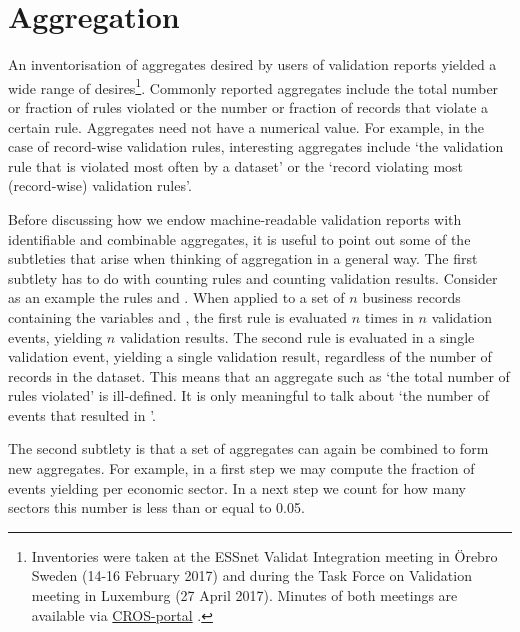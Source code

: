 \section{Aggregation}
\label{sect:aggregation}
An inventorisation of aggregates desired by users of validation reports
yielded a wide range of desires\footnote{Inventories were taken at 
the ESSnet Validat Integration meeting in \"Orebro Sweden (14-16 February 2017) and during
the Task Force on Validation meeting in Luxemburg (27 April 2017). Minutes of both
meetings are available via \href{https://ec.europa.eu/eurostat/cros}{CROS-portal} .}.
Commonly reported aggregates include the total number or fraction of rules
violated or the number or fraction of records  that violate a certain rule.
Aggregates need not have a numerical value. For example, in the case of
record-wise validation rules, interesting aggregates include `the validation
rule that is violated most often by a dataset' or the `record violating most
(record-wise) validation rules'. 

Before discussing how we endow machine-readable validation reports with
identifiable and combinable aggregates, it is useful to point out some of the
subtleties that arise when thinking of aggregation in a general way. The first
subtlety has to do with counting rules and counting validation results.
Consider as an example the rules  and .  When applied to a set of $n$ business records containing the variables
 and , the first rule is evaluated $n$ times in $n$
validation events, yielding $n$ validation results. The second rule is
evaluated in a single validation event, yielding a single validation result,
regardless of the number of records in the dataset. This means that an
aggregate such as `the total number of rules violated' is ill-defined. It is
only meaningful to talk about `the number of events that resulted in
\onwaar{}'. 

The second subtlety is that a set of aggregates can again be combined to form
new aggregates. For example, in a first step we may compute the fraction of
events yielding \onwaar{} per economic sector. In a next step we count for how
many sectors this number is less than or equal to 0.05.

